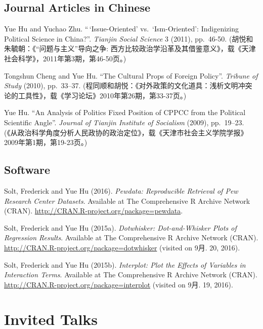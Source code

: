 \documentclass[10.5pt,]{article}
\begin{document}
\hypertarget{journal-articles-in-chinese}{%
\subsection{Journal Articles in
Chinese}\label{journal-articles-in-chinese}}

Yue Hu and Yuchao Zhu. ``\,`Issue-Oriented' vs.~`Ism-Oriented':
Indigenizing Political Science in China?''. \emph{Tianjin Social
Science} 3 (2011), pp.~46-50. (胡悦和朱毓朝：《``问题与主义''导向之争:
西方比较政治学沿革及其借鉴意义》，载《天津社会科学》，2011年第3期，第46-50页。)

Tongshun Cheng and Yue Hu. ``The Cultural Props of Foreign Policy''.
\emph{Tribune of Study} (2010), pp.~33--37.
(程同顺和胡悦：《对外政策的文化道具：浅析文明冲突论的工具性》，载《学习论坛》2010年第26期，第33-37页。)

Yue Hu. ``An Analysis of Politics Fixed Position of CPPCC from the
Political Scientific Angle''. \emph{Journal of Tianjin Institute of
Socialism} (2009), pp.~19--23.
(《从政治科学角度分析人民政协的政治定位》，载《天津市社会主义学院学报》
2009年第1期，第19-23页。)

\vspace{\baselineskip}

\hypertarget{software}{%
\subsection{Software}\label{software}}

Solt, Frederick and Yue Hu (2016).
\emph{Pewdata: Reproducible Retrieval of Pew Research Center Datasets}.
Available at The Comprehensive R Archive Network (CRAN).
\url{http://CRAN.R-project.org/package=pewdata}.

Solt, Frederick and Yue Hu (2015a).
\emph{Dotwhisker: Dot-and-Whisker Plots of Regression Results}.
Available at The Comprehensive R Archive Network (CRAN).
\url{http://CRAN.R-project.org/package=dotwhisker} (visited on 9月. 20,
2016).

Solt, Frederick and Yue Hu (2015b).
\emph{Interplot: Plot the Effects of Variables in Interaction Terms}.
Available at The Comprehensive R Archive Network (CRAN).
\url{http://CRAN.R-project.org/package=interplot} (visited on 9月. 19,
2016).

\vspace{\baselineskip}

\hypertarget{invited-talks}{%
\section{Invited Talks}\label{invited-talks}}
\end{document}
